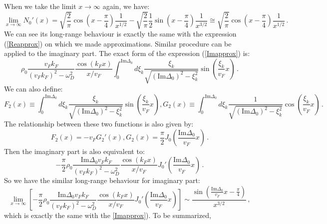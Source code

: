 \documentclass[aps,onecolumn,nofootinbib,superscriptaddress,notitlepage,longbibliography]{revtex4-1}
\begin{document}
When we take the limit $x\rightarrow\infty$ again, we have: 
\begin{equation}
\lim_{x\rightarrow\infty}N_{0}'(x)=\sqrt{\frac{2}{\pi}}\cos\left(x-\frac{\pi}{4}\right)\frac{1}{x^{1/2}}-\sqrt{\frac{2}{\pi}}\frac{1}{2}\sin\left(x-\frac{\pi}{4}\right)\frac{1}{x^{3/2}}\cong\sqrt{\frac{2}{\pi}}\cos\left(x-\frac{\pi}{4}\right)\frac{1}{x^{1/2}}\,.\label{Realexact}
\end{equation}
We can see its long-range behaviour is exactly the same with the expression
(\ref{Reapprox}) on which we made approximations. Similar procedure
can be applied to the imaginary part. The exact form of the expression
(\ref{Imapprox}) is: 
\begin{equation}
\rho_{0}\frac{v_{F}k_{F}}{(v_{F}k_{F})^{2}-\omega_{D}^{2}}\frac{\cos(k_{F}x)}{x/v_{F}}\int_{0}^{\text{Im}\Delta_{0}}d\xi_{k}\frac{\xi_{k}}{\sqrt{(\text{Im}\Delta_{0})^{2}-\xi_{k}^{2}}}\sin\left(\frac{\xi_{k}}{v_{F}}x\right)\,.
\end{equation}
We can also define: 
\begin{equation}
F_{2}(x)\equiv\int_{0}^{\text{Im}\Delta_{0}}d\xi_{k}\frac{\xi_{k}}{\sqrt{(\text{Im}\Delta_{0})^{2}-\xi_{k}^{2}}}\sin\left(\frac{\xi_{k}}{v_{F}}x\right),G_{2}(x)\equiv\int_{0}^{\text{Im}\Delta_{0}}d\xi_{k}\frac{1}{\sqrt{(\text{Im}\Delta_{0})^{2}-\xi_{k}^{2}}}\cos\left(\frac{\xi_{k}}{v_{F}}x\right)\,.
\end{equation}
The relationship between these two functions is also given by: 
\begin{equation}
F_{2}(x)=-v_{F}G_{2}'(x),G_{2}(x)=\frac{\pi}{2}J_{0}\left(\frac{\text{Im}\Delta_{0}}{v_{F}}x\right)\,.
\end{equation}
Then the imaginary part is also equivalent to: 
\begin{equation}
-\frac{\pi}{2}\rho_{0}\frac{\text{Im}\Delta_{0}v_{F}k_{F}}{(v_{F}k_{F})^{2}-\omega_{D}^{2}}\frac{\cos(k_{F}x)}{x/v_{F}}J_{0}'\left(\frac{\text{Im}\Delta_{0}}{v_{F}}x\right)\,.
\end{equation}
So we have the similar long-range behaviour for imaginary part: 
\begin{equation}
\lim_{x\rightarrow\infty}\left[-\frac{\pi}{2}\rho_{0}\frac{\text{Im}\Delta_{0}v_{F}k_{F}}{(v_{F}k_{F})^{2}-\omega_{D}^{2}}\frac{\cos(k_{F}x)}{x/v_{F}}J_{0}'\left(\frac{\text{Im}\Delta_{0}}{v_{F}}x\right)\right]\sim\frac{\sin\left(\frac{\text{Im}\Delta_{0}}{v_{F}}x-\frac{\pi}{4}\right)}{x^{3/2}}\,,\label{Imexact}
\end{equation}
which is exactly the same with the \ref{Imapprox}). To be summarized,
\end{document}
